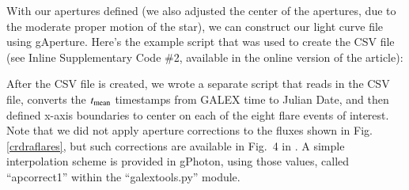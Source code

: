 \documentclass[5p]{elsarticle}
\begin{document}

With our apertures defined (we also adjusted the center of the apertures, due to the moderate proper motion of the star), we can construct our light curve file using gAperture.  Here's the example script that was used to create the CSV file (see Inline Supplementary Code \#2, available in the online version of the article):


After the CSV file is created, we wrote a separate script that reads in the CSV file, converts the $t_{\rm{mean}}$ timestamps from GALEX time to Julian Date, and then defined x-axis boundaries to center on each of the eight flare events of interest.  Note that we did not apply aperture corrections to the fluxes shown in Fig. \ref{crdraflares}, but such corrections are available in Fig.\ 4 in \citet{mor2007}.  A simple interpolation scheme is provided in gPhoton, using those values, called ``apcorrect1'' within the ``galextools.py'' module.
\end{document}
